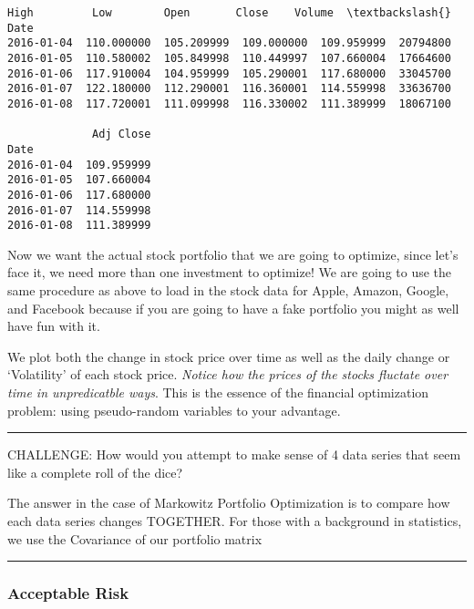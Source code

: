 \documentclass[11pt]{article}
\makeatletter
\newcommand{\boxspacing}{\kern\kvtcb@left@rule\kern\kvtcb@boxsep}
\newcommand{\prompt}[4]{
        \ttfamily\llap{{\color{#2}[#3]:\hspace{3pt}#4}}\vspace{-\baselineskip}
    }
\makeatother
\begin{document}
            \begin{tcolorbox}[breakable, size=fbox, boxrule=.5pt, pad at break*=1mm, opacityfill=0]
\prompt{Out}{outcolor}{17}{\boxspacing}
\begin{Verbatim}[commandchars=\\\{\}]
                  High         Low        Open       Close    Volume  \textbackslash{}
Date
2016-01-04  110.000000  105.209999  109.000000  109.959999  20794800
2016-01-05  110.580002  105.849998  110.449997  107.660004  17664600
2016-01-06  117.910004  104.959999  105.290001  117.680000  33045700
2016-01-07  122.180000  112.290001  116.360001  114.559998  33636700
2016-01-08  117.720001  111.099998  116.330002  111.389999  18067100

             Adj Close
Date
2016-01-04  109.959999
2016-01-05  107.660004
2016-01-06  117.680000
2016-01-07  114.559998
2016-01-08  111.389999
\end{Verbatim}
\end{tcolorbox}
        
    Now we want the actual stock portfolio that we are going to optimize,
since let's face it, we need more than one investment to optimize! We
are going to use the same procedure as above to load in the stock data
for Apple, Amazon, Google, and Facebook because if you are going to have
a fake portfolio you might as well have fun with it.

We plot both the change in stock price over time as well as the daily
change or `Volatility' of each stock price. \emph{Notice how the prices
of the stocks fluctate over time in unpredicatble ways}. This is the
essence of the financial optimization problem: using pseudo-random
variables to your advantage.

\begin{center}\rule{0.5\linewidth}{0.5pt}\end{center}

CHALLENGE: How would you attempt to make sense of 4 data series that
seem like a complete roll of the dice?

The answer in the case of Markowitz Portfolio Optimization is to compare
how each data series changes TOGETHER. For those with a background in
statistics, we use the Covariance of our portfolio matrix

\begin{center}\rule{0.5\linewidth}{0.5pt}\end{center}

\hypertarget{acceptable-risk}{%
\subsubsection{Acceptable Risk}\label{acceptable-risk}}
\end{document}
